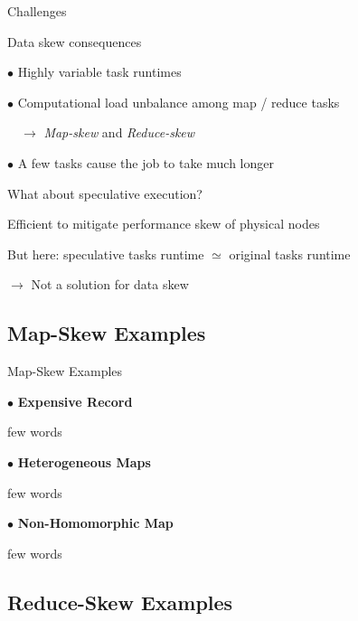 \documentclass[11pt]{beamer}
\begin{document}

\begin{frame}{Challenges \cite{Kwon11astudy} }

\begin{alertblock}{Data skew consequences}

$\bullet$ Highly variable task runtimes

$\bullet$ Computational load unbalance among map / reduce tasks

$\quad \longrightarrow$ \emph{Map-skew} and \emph{Reduce-skew}

$\bullet$ A few tasks cause the job to take much longer
\end{alertblock}

\vfill

\begin{block}{What about speculative execution?}

Efficient to mitigate performance skew of physical nodes

But here: speculative tasks runtime $\simeq$ original tasks runtime

$\longrightarrow$ Not a solution for data skew

\end{block}

\end{frame}


\subsection{Map-Skew Examples}

\begin{frame}{Map-Skew Examples \cite{Kwon11astudy}}

$\bullet$ \textbf{Expensive Record}

few words

\vfill

$\bullet$ \textbf{Heterogeneous Maps}

few words

\vfill

$\bullet$ \textbf{Non-Homomorphic Map}

few words

\end{frame}


\subsection{Reduce-Skew Examples}
\end{document}
